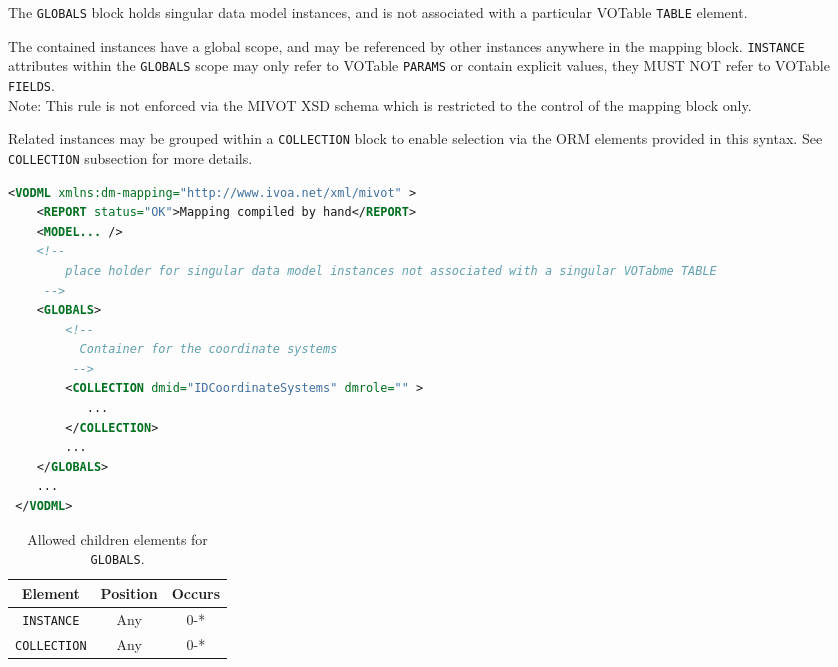 The \texttt{GLOBALS} block holds singular data model instances, and is not associated 
with a particular VOTable \texttt{TABLE} element.

The contained instances have a global scope, and may be
referenced by other instances anywhere in the mapping block.  \texttt{INSTANCE} attributes
within the \texttt{GLOBALS} scope may only refer to VOTable \texttt{PARAMS} or contain
explicit values, they MUST NOT refer to VOTable \texttt{FIELDS}.  \\ 
Note: This rule is not enforced via the MIVOT XSD schema which is restricted to the control of the mapping block only.

Related instances may be grouped within a \texttt{COLLECTION} block to enable selection
via the ORM elements provided in this syntax.  See \texttt{COLLECTION} subsection for more details.

\begin{lstlisting}[caption={Example \texttt{GLOBALS} block (see in \ref{GLOBALS_snippet}) which contains a collection of coordinate systems.},language=XML]
<VODML xmlns:dm-mapping="http://www.ivoa.net/xml/mivot" >
    <REPORT status="OK">Mapping compiled by hand</REPORT>
    <MODEL... />
    <!--	             
        place holder for singular data model instances not associated with a singular VOTabme TABLE
     -->
    <GLOBALS>
        <!--
          Container for the coordinate systems
         -->
        <COLLECTION dmid="IDCoordinateSystems" dmrole="" >
           ...
        </COLLECTION>
        ...
    </GLOBALS>
    ...
 </VODML>
\end{lstlisting}


\begin{table}[!htbp]
  \small
  \centering
  \begin{tabulary}{\linewidth}{|c |c |c|}
    \hline 
        \textbf{Element} &
        \textbf{Position} &
        \textbf{Occurs}\\
    \hline
    \hline
        \texttt{INSTANCE} &
        Any &
        0-*\\
    \hline
        \texttt{COLLECTION} &
        Any &
        0-*\\
    \hline
  \end{tabulary}
  \caption{Allowed children elements for \texttt{GLOBALS}.} 
  \label{tbl:globals-children}
 \end{table}
